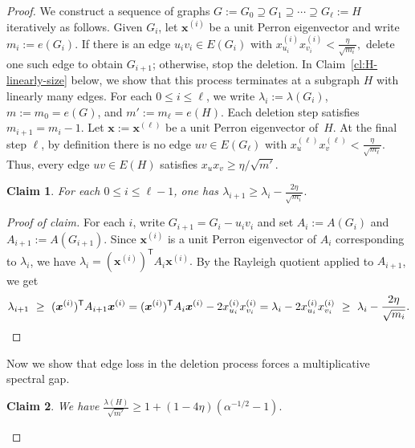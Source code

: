 \documentclass[10pt,a4paper]{amsart}
\newtheorem{claim}{Claim}
\newenvironment{poc}{\begin{proof}[Proof of claim]\renewcommand*{\qedsymbol}{$\blacksquare$}}{\end{proof}}
\begin{document}
\begin{proof} 
We construct a sequence of graphs $G:=G_0\supseteq G_1\supseteq \cdots \supseteq G_\ell :=H$ iteratively as follows.
Given $G_i$, let $\bm{x}^{(i)}$ be a unit Perron eigenvector and write $m_i:=e(G_i)$.
If there is an edge $u_iv_i\in E(G_i)$ with $x^{(i)}_{u_i}x^{(i)}_{v_i}<\frac{\eta}{\sqrt{m_i}},$
delete one such edge to obtain $G_{i+1}$; otherwise, stop the deletion. 
In Claim~\ref{cl:H-linearly-size} below, we show that this process terminates at a subgraph \(H\) with linearly many edges.  
For each $0\le i\le \ell$, 
we write $\lambda_i:=\lambda(G_i)$, $m:=m_0=e(G)$, and $m':=m_\ell=e(H)$.
Each deletion step satisfies $m_{i+1}=m_i-1$. 
Let $\bm{x}:=\bm{x}^{(\ell)}$ be a unit Perron eigenvector of~$H$. 
At the final step $\ell$, by definition there is no edge $uv\in E(G_\ell)$ with
$x^{(\ell)}_ux^{(\ell)}_v<\frac{\eta}{\sqrt{m_\ell}}.$
Thus, every edge $uv\in E(H)$ satisfies $x_u x_v\ge \eta/\sqrt{m'}$.

\begin{claim}\label{clm:pruning-one-step-rayleigh}
For each $0\le i\le \ell-1$, one has $\lambda_{i+1} \ge \lambda_i-\frac{2\eta}{\sqrt{m_i}}.$
\end{claim}

\begin{poc} 
For each $i$, write $G_{i+1}=G_i-u_iv_i$ and set $A_i:=A(G_i)$ and $A_{i+1}:=A(G_{i+1})$.
Since $\bm{x}^{(i)}$ is a unit Perron eigenvector of $A_i$ corresponding to \(\lambda_i\), we have $\lambda_i=(\bm{x}^{(i)})^{\mathsf T}A_i \bm{x}^{(i)}.$
By the Rayleigh quotient applied to $A_{i+1}$, we get 
\[
  \lambda_{i+1}
  \ \ge\
  (\bm{x}^{(i)})^{\mathsf T}A_{i+1}\bm{x}^{(i)}
  =
  (\bm{x}^{(i)})^{\mathsf T}A_i \bm{x}^{(i)}-2x^{(i)}_{u_i}x^{(i)}_{v_i}
  =
  \lambda_i-2x^{(i)}_{u_i}x^{(i)}_{v_i}
  \ \ge\ \lambda_i-\frac{2\eta}{\sqrt{m_i}}. 
  \qedhere 
\]
\end{poc}
 
Now we show that edge loss in the deletion process forces a multiplicative spectral gap.

\begin{claim} \label{claim:multiplicative-gap}
  We have
$\frac{\lambda(H)}{\sqrt{m'}}
        \ge
        1+ (1- 4\eta) (\alpha^{-1/2} -1).$
\end{claim}


\end{proof}
\end{document}
